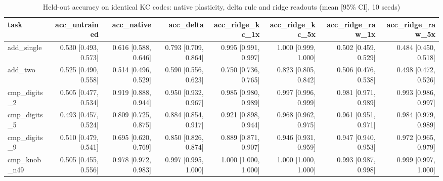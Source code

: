 \begin{table}[t]
\centering
\small
\begin{tabular}{lrrrrrrr}
\toprule
task & acc\_untrained & acc\_native & acc\_delta & acc\_ridge\_kc\_1x & acc\_ridge\_kc\_5x & acc\_ridge\_raw\_1x & acc\_ridge\_raw\_5x \\
\midrule
add\_single & 0.530 [0.493, 0.573] & 0.616 [0.588, 0.646] & 0.793 [0.709, 0.864] & 0.995 [0.991, 0.997] & 1.000 [0.999, 1.000] & 0.502 [0.459, 0.529] & 0.484 [0.450, 0.518] \\
add\_two & 0.525 [0.490, 0.558] & 0.514 [0.496, 0.529] & 0.590 [0.556, 0.623] & 0.750 [0.736, 0.765] & 0.823 [0.805, 0.842] & 0.506 [0.476, 0.538] & 0.498 [0.472, 0.526] \\
cmp\_digits\_2 & 0.505 [0.477, 0.534] & 0.919 [0.888, 0.944] & 0.950 [0.932, 0.967] & 0.985 [0.980, 0.989] & 0.997 [0.996, 0.999] & 0.981 [0.971, 0.989] & 0.993 [0.986, 0.997] \\
cmp\_digits\_5 & 0.493 [0.457, 0.524] & 0.809 [0.725, 0.875] & 0.884 [0.854, 0.917] & 0.921 [0.898, 0.944] & 0.968 [0.962, 0.975] & 0.961 [0.951, 0.971] & 0.984 [0.979, 0.989] \\
cmp\_digits\_9 & 0.510 [0.479, 0.541] & 0.695 [0.620, 0.769] & 0.850 [0.826, 0.874] & 0.889 [0.871, 0.907] & 0.946 [0.931, 0.959] & 0.947 [0.940, 0.953] & 0.972 [0.965, 0.979] \\
cmp\_knob\_n49 & 0.505 [0.455, 0.556] & 0.978 [0.972, 0.983] & 0.997 [0.995, 1.000] & 1.000 [1.000, 1.000] & 1.000 [1.000, 1.000] & 0.993 [0.987, 0.998] & 0.999 [0.997, 1.000] \\
\bottomrule
\end{tabular}
\caption{Held-out accuracy on identical KC codes: native plasticity, delta rule and ridge readouts (mean [95\% CI], 10 seeds)}
\label{tab:readouts_acc}
\end{table}
